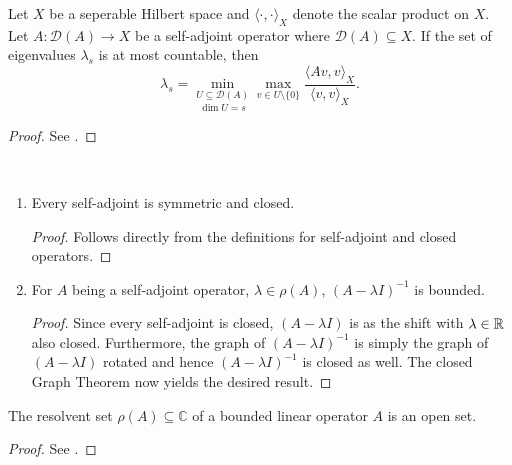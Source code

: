 \begin{atheorem} \label{athm:poincare}
	Let $X$ be a seperable Hilbert space and $\langle \cdot, \cdot \rangle_{X}$ denote the scalar product on $X$. Let $A \colon \mathcal{D}(A) \rightarrow X$ be a self-adjoint operator where $\mathcal{D}(A) \subseteq X$. If the set of eigenvalues $\lambda_{s}$ is at most countable, then
	\begin{equation*}
			\lambda_{s} = \underset{\dim U = s}{\min_{U \subseteq \mathcal{D}(A)}} \max_{v \in U \setminus \{ 0 \} } \frac{\langle A v, v \rangle_{X}}{\langle v, v \rangle_{X}}. 
	\end{equation*} 

	\begin{proof}
		See \cite[p. 119]{teschl2014mathematical}.
	\end{proof}
\end{atheorem}

\begin{atheorem} ~\
	\begin{enumerate}[label=\alph*\upshape)]
		\item Every self-adjoint is symmetric and closed.
			\begin{proof}
				 Follows directly from the definitions for self-adjoint and closed operators.
			\end{proof}
		\item For $A$ being a self-adjoint operator, $\lambda \in \rho(A)$, $(A - \lambda I)^{-1}$ is bounded.
			\begin{proof}
				Since every self-adjoint is closed, $(A - \lambda I)$ is as the shift with $\lambda \in \mathbb{R}$ also closed. Furthermore, the graph of $(A - \lambda I)^{-1}$ is simply the graph of $(A - \lambda I)$ rotated and hence $(A - \lambda I)^{-1}$ is closed as well. The closed Graph Theorem now yields the desired result.
			\end{proof}
	\end{enumerate}
\end{atheorem}

\begin{atheorem}
	The resolvent set $\rho(A) \subseteq \mathbb{C}$ of a bounded linear operator $A$ is an open set.
	
	\begin{proof}
		See \cite[p. 259]{werner2006funkana}.
	\end{proof}
\end{atheorem}

